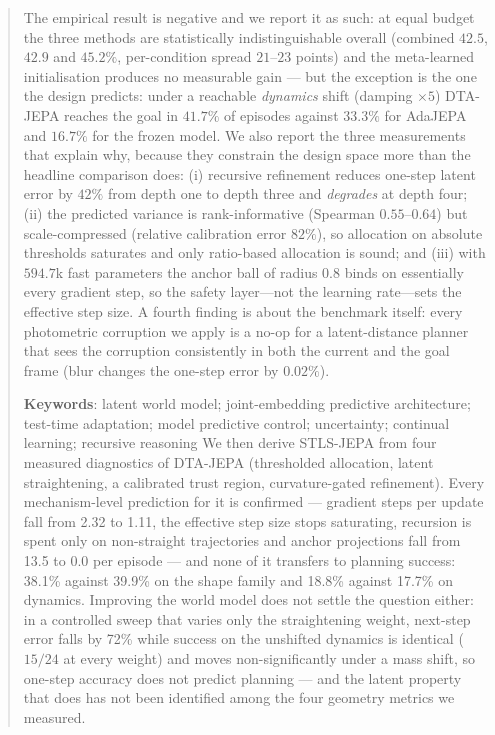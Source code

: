 \documentclass[a4paper]{article}
\theoremstyle{cnplain}
\theoremstyle{cndef}
\begin{document}
\begin{abstract}
\medskip
\noindent The empirical result is negative and we report it as such: at equal budget the three
methods are statistically indistinguishable overall (combined $42.5$, $42.9$ and $45.2\%$,
per-condition spread $21$--$23$ points) and the meta-learned initialisation produces no
measurable gain --- but the exception is the one the design predicts: under a reachable
\emph{dynamics} shift (damping $\times5$) DTA-JEPA reaches the goal in $41.7\%$ of episodes
against $33.3\%$ for AdaJEPA and $16.7\%$ for the frozen model. We also report the three
measurements that explain why, because they constrain the design space more than the headline
comparison does: (i) recursive refinement reduces one-step latent error by $42\%$ from depth
one to depth three and \emph{degrades} at depth four; (ii) the predicted variance is
rank-informative (Spearman $0.55$--$0.64$) but scale-compressed (relative calibration error
$82\%$), so allocation on absolute thresholds saturates and only ratio-based allocation is
sound; and (iii) with $594.7$k fast parameters the anchor ball of radius $0.8$ binds on
essentially every gradient step, so the safety layer---not the learning rate---sets the
effective step size. A fourth finding is about the benchmark itself: every photometric
corruption we apply is a no-op for a latent-distance planner that sees the corruption
consistently in both the current and the goal frame (blur changes the one-step error by
$0.02\%$).

\medskip
\noindent\textbf{Keywords}: latent world model; joint-embedding predictive architecture;
test-time adaptation; model predictive control; uncertainty; continual learning; recursive
reasoning
We then derive STLS-JEPA from four measured diagnostics of DTA-JEPA (thresholded allocation,
latent straightening, a calibrated trust region, curvature-gated refinement). Every mechanism-level
prediction for it is confirmed --- gradient steps per update fall from 2.32 to 1.11, the effective step
size stops saturating, recursion is spent only on non-straight trajectories and anchor projections fall
from 13.5 to 0.0 per episode --- and none of it transfers to planning success: 38.1\% against
39.9\% on the shape family and 18.8\% against 17.7\% on dynamics. Improving the world model
does not settle the question either: in a controlled sweep that varies only the straightening
weight, next-step error falls by 72\% while success on the unshifted dynamics is identical
($15/24$ at every weight) and moves non-significantly under a mass shift, so one-step accuracy does
not predict planning --- and the latent property that does has not been identified among the four
geometry metrics we measured.

\end{abstract}

\clearpage












\end{document}
